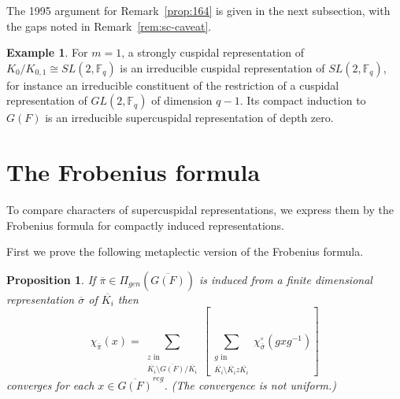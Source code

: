 \documentclass[12pt,letterpaper,openany]{book}
\theoremstyle{plain}
\newtheorem{proposition}[theorem]{Proposition}
\theoremstyle{definition}
\newtheorem{example}[theorem]{Example}
\theoremstyle{remark}
\theoremstyle{remark}
\begin{document}
The 1995 argument for Remark~\ref{prop:164} is given in the next subsection,
with the gaps noted in Remark~\ref{rem:sc-caveat}.

\begin{example}
For $m=1$, a strongly cuspidal representation of $K_0/K_{0,1}\cong
SL(2,{\mathbb F}_q)$ is an irreducible cuspidal representation of
$SL(2,{\mathbb F}_q)$, for instance an irreducible constituent of the
restriction of a cuspidal representation of $GL(2,{\mathbb F}_q)$ of
dimension $q-1$. Its compact induction to $G(F)$ is an irreducible
supercuspidal representation of depth zero.
\end{example}

\section{The Frobenius formula}

To compare characters of supercuspidal representations, we express them by the Frobenius formula for compactly induced representations.


First we prove the following metaplectic version of the Frobenius formula.

\begin{proposition} If $\overline{\pi} \in \Pi_{gen}(\overline{G(F)})$
is induced from a finite dimensional representation $\overline{\sigma}$
of $\overline{K_i}$ then
$$
\chi_{\overline{\pi}} (x)=\sum_{\substack{ z \text{ in }\\
\overline{K_i}\setminus\overline{G(F)}/\overline{K_i}}}
\left[\sum_{\substack{ g \text{ in }\\
\overline{K_i}\setminus\overline{K_i}z\overline{K_i}}}
\chi_{\overline{\sigma}}^\circ (gxg^{-1})\right]
$$
converges for each $x\in \overline{G(F)}^{reg}$. (The convergence is not
uniform.)
\label{prop:166}
\end{proposition}
\end{document}
